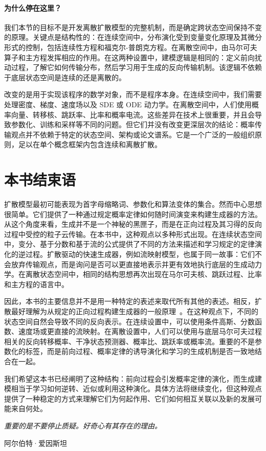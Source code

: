 \paragraph{为什么停在这里？}
我们本节的目标不是开发离散扩散模型的完整机制，而是确定跨状态空间保持不变的原理。关键点是结构性的：在连续空间中，分布演化受到变量变化原理及其微分形式的控制，包括连续性方程和福克尔-普朗克方程。在离散空间中，由马尔可夫算子和主方程发挥相应的作用。在这两种设置中，建模逻辑是相同的：定义前向扰动过程，了解它如何传输分布，然后学习用于生成的反向传输机制。该逻辑不依赖于底层状态空间是连续的还是离散的。

改变的是用于实现该程序的数学对象，而不是程序本身。在连续空间中，我们需要处理密度、梯度、速度场以及 SDE 或 ODE 动力学。在离散空间中，人们使用概率向量、转移核、跳跃率、比率和概率电流。这些差异在技术上很重要，并且会导致参数化、训练和采样等不同的问题。但它们并没有改变更深层次的结论：概率传输观点并不依赖于特定的状态空间、架构或论文谱系。它是一个广泛的一般组织原则，足以在单个概念框架内包含连续和离散扩散。


\section{本书结束语}\label{sec:epilogue-closing}
扩散模型最初可能表现为首字母缩略词、参数化和算法变体的集合。然而中心思想很简单。它们提供了一种通过规定概率定律如何随时间演变来构建生成器的方法。从这个角度来看，生成并不是一个神秘的黑匣子，而是在正向过程及其习得的反向过程中受控的粒子云传输。在本书中，这种观点以多种形式出现。在连续状态空间中，变分、基于分数和基于流的公式提供了不同的方法来描述和学习规定的定律演化的逆过程。扩散驱动的快速生成器，例如流映射模型，也属于同一故事：它们不会放弃传输观点，而是询问是否可以更直接地表示并更有效地执行底层的生成动力学。在离散状态空间中，相同的结构思想再次出现在马尔可夫核、跳跃过程、比率和主方程的语言中。

因此，本书的主要信息并不是用一种特定的表述来取代所有其他的表述。相反，扩散最好理解为从规定的正向过程构建生成器的一般原理~\citep{lai2026unified}。在这种观点下，不同的状态空间自然会导致不同的反向表示。在连续设置中，可以使用条件高斯、分数函数、速度场或更直接的流映射。在离散设置中，人们可以使用与底层马尔可夫过程相关的反向转移概率、干净状态预测器、概率比、跳跃率或概率流。重要的不是参数化的标签，而是前向过程、概率定律的诱导演化和学习的生成机制是否一致地结合在一起。

我们希望这本书已经阐明了这种结构：前向过程会引发概率定律的演化，而生成建模相当于学习如何逆转、近似或利用这种演化。具体方法将继续变化，但这种观点提供了一种稳定的方式来理解它们为何起作用、它们如何相互关联以及新的发展可能来自何处。

\epigraph{\textit{重要的是不要停止质疑。好奇心有其存在的理由。}}{阿尔伯特·爱因斯坦}
